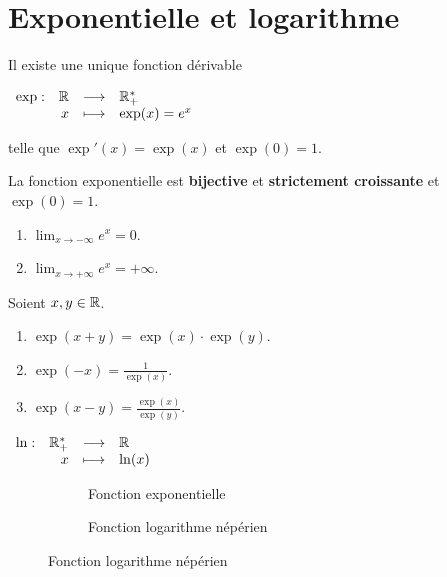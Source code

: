 \section{Exponentielle et logarithme}

\begin{theorem}
	Il existe une unique fonction dérivable 
	\begin{center}
		$
		\begin{array}{rrcl} \exp : & \mathbb{R} & \longrightarrow & \mathbb{R}_+^* \\ & x & \longmapsto & \exp(x) = e^x \end{array}
		$
	\end{center}
	telle que $\exp'(x) = \exp(x)$ et $\exp(0) = 1$.
\end{theorem}



\begin{proposition}
	La fonction exponentielle est \textbf{bijective} et \textbf{strictement croissante} et $\exp(0) = 1$.
    \begin{enumerate}
            \item $\lim_{x \to -\infty} e^x = 0$.
            \item $\lim_{x \to +\infty} e^x = +\infty$.
        \end{enumerate}
    \noindent Soient $x, y \in \mathbb{R}$.
    \begin{enumerate}
            \item $\exp(x + y) = \exp(x) \cdot \exp(y)$.
            \item $\exp(-x) = \frac{1}{\exp(x)}$.
            \item $\exp(x - y) = \frac{\exp(x)}{\exp(y)}$.
        \end{enumerate}
\end{proposition}

\begin{definition}
	\begin{center}
		$
		\begin{array}{rrcl} \ln : & \mathbb{R}_+^* & \longrightarrow & \mathbb{R} \\ & x & \longmapsto & \ln(x) \end{array}
		$
	\end{center}
\end{definition}

\begin{figure}[!h]
	\centering
	\begin{subfigure}{0.45\textwidth}
		\caption{Fonction exponentielle}
	\end{subfigure}
	\begin{subfigure}{0.45\textwidth}
		\caption{Fonction logarithme népérien}
	\end{subfigure}
\end{figure}

